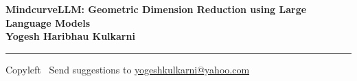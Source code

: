 
\graphicspath{{images/}}

\footnotesize


\begin{center}
\Large{\textbf{MindcurveLLM: Geometric Dimension Reduction using Large Language Models\\ Yogesh Haribhau Kulkarni}}  
\end{center}

\begin{multicols}{2}

\end{multicols}

\rule{\linewidth}{0.25pt}
\scriptsize
Copyleft \textcopyleft\  Send suggestions to 
\href{http://www.yogeshkulkarni.com}{yogeshkulkarni@yahoo.com}


